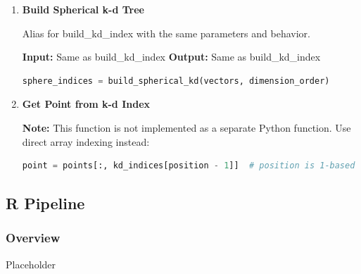 \documentclass[11pt]{article}
\begin{document}
\begin{enumerate}
\begin{enumerate}
	      	\item \textbf{Build Spherical k-d Tree}
	      	      
	      	      Alias for build\_kd\_index with the same parameters and behavior.
	      	      
	      	      \textbf{Input:} Same as build\_kd\_index \textbf{Output:} Same as build\_kd\_index
	      	      \begin{lstlisting}[language=Python]
sphere_indices = build_spherical_kd(vectors, dimension_order)
	      	      \end{lstlisting}
	      	      
	      	\item \textbf{Get Point from k-d Index}
	      	      
	      	      \textbf{Note:} This function is not implemented as a separate Python
	      	      function. Use direct array indexing instead:
	      	      \begin{lstlisting}[language=Python]
point = points[:, kd_indices[position - 1]]  # position is 1-based
	      	      \end{lstlisting}
	      \end{enumerate}
\end{enumerate}

\subsection{R Pipeline}
\subsubsection{Overview}
Placeholder
\end{document}
